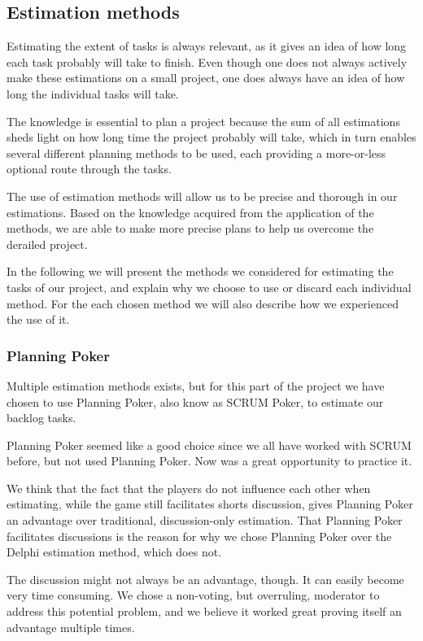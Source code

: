 \subsection{Estimation methods}
Estimating the extent of tasks is always relevant, as it gives an idea of how long each task probably will take to finish. Even though one does not always actively make these estimations on a small project, one does always have an idea of how long the individual tasks will take.

The knowledge is essential to plan a project because the sum of all estimations sheds light on how long time the project probably will take, which in turn enables several different planning methods to be used, each providing a more-or-less optional route through the tasks.

The use of estimation methods will allow us to be precise and thorough in our estimations. Based on the knowledge acquired from the application of the methods, we are able to make more precise plans to help us overcome the derailed project.

In the following we will present the methods we considered for estimating the tasks of our project, and explain why we choose to use or discard each individual method. For the each chosen method we will also describe how we experienced the use of it.

\subsubsection{Planning Poker}
Multiple estimation methods exists, but for this part of the project we have chosen to use Planning Poker, also know as SCRUM Poker, to estimate our backlog tasks.

Planning Poker seemed like a good choice since we all have worked with SCRUM before, but not used Planning Poker. Now was a great opportunity to practice it.

We think that the fact that the players do not influence each other when estimating, while the game still facilitates shorts discussion, gives Planning Poker an advantage over traditional, discussion-only estimation.
That Planning Poker facilitates discussions is the reason for why we chose Planning Poker over the Delphi estimation method, which does not.

The discussion might not always be an advantage, though. It can easily become very time consuming. We chose a non-voting, but overruling, moderator to address this potential problem, and we believe it worked great proving itself an advantage multiple times.

